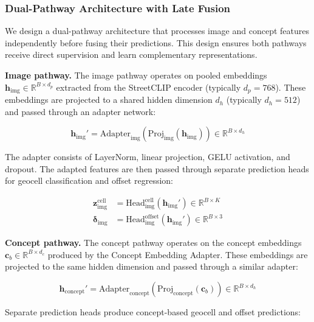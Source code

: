 \documentclass{article}
\begin{document}
\subsubsection{Dual-Pathway Architecture with Late Fusion}

We design a dual-pathway architecture that processes image and concept features independently before fusing their predictions. This design ensures both pathways receive direct supervision and learn complementary representations.

\textbf{Image pathway.} The image pathway operates on pooled embeddings $\mathbf{h}_{\text{img}} \in \mathbb{R}^{B \times d_p}$ extracted from the StreetCLIP encoder (typically $d_p = 768$). These embeddings are projected to a shared hidden dimension $d_h$ (typically $d_h = 512$) and passed through an adapter network:

\begin{equation}
\mathbf{h}_{\text{img}}' = \text{Adapter}_{\text{img}}(\text{Proj}_{\text{img}}(\mathbf{h}_{\text{img}})) \in \mathbb{R}^{B \times d_h}
\end{equation}

The adapter consists of LayerNorm, linear projection, GELU activation, and dropout. The adapted features are then passed through separate prediction heads for geocell classification and offset regression:

\begin{align}
\mathbf{z}_{\text{img}}^{\text{cell}} &= \text{Head}_{\text{img}}^{\text{cell}}(\mathbf{h}_{\text{img}}') \in \mathbb{R}^{B \times K} \\
\boldsymbol{\delta}_{\text{img}} &= \text{Head}_{\text{img}}^{\text{offset}}(\mathbf{h}_{\text{img}}') \in \mathbb{R}^{B \times 3}
\end{align}

\textbf{Concept pathway.} The concept pathway operates on the concept embeddings $\mathbf{c}_b \in \mathbb{R}^{B \times d_c}$ produced by the Concept Embedding Adapter. These embeddings are projected to the same hidden dimension and passed through a similar adapter:

\begin{equation}
\mathbf{h}_{\text{concept}}' = \text{Adapter}_{\text{concept}}(\text{Proj}_{\text{concept}}(\mathbf{c}_b)) \in \mathbb{R}^{B \times d_h}
\end{equation}

Separate prediction heads produce concept-based geocell and offset predictions:
\end{document}
